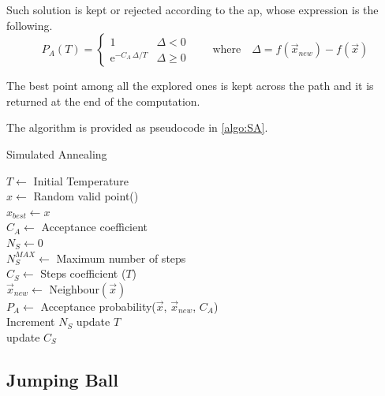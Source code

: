 \documentclass[12pt,journal,draftclsnofoot,onecolumn]{IEEEtran}
\begin{document}
Such solution is kept or rejected according to the \gls{ap}, whose expression is the following.
\begin{equation*} \label{accept_prob}
	P_A(T) = \begin{cases}
		1 & \Delta < 0 \\
		\mathrm{e}^{ - C_A \, \Delta / T }
		& \Delta \geq 0
	\end{cases}
	\quad \quad \text{where} \quad \Delta = f(\vec{x}_{new})-f (\vec{x})
\end{equation*}

The best point among all the explored ones is kept across the path and it is returned at the end of the computation.

The algorithm is provided as pseudocode in \autoref{algo:SA}.

\begin{algorithm}
\caption{Simulated Annealing} \label{algo:SA}

$T \gets$ Initial Temperature \\
$x \gets$ Random valid point() \\
$x_{best} \gets x$ \\
$C_A \gets$ Acceptance coefficient \\
$N_S \gets 0$ \\
$N_S^{MAX} \gets $ Maximum number of steps \\

 {
	$C_S \gets$ Steps coefficient ($T$) \\
	 {
		$\vec{x}_{new} \gets$ Neighbour$(\vec{x})$\\
		$P_A \gets$ Acceptance probability($\vec{x}$, $\vec{x}_{new}$, $C_A$) \\
		Increment $N_S$
	}
	update $T$\\
	update $C_S$\\
}
\end{algorithm}

\subsection{Jumping Ball}
\end{document}
